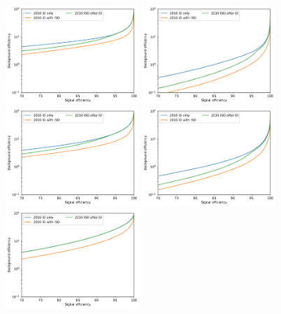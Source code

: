 \begin{figure}[!htb]
   \vspace*{0.3cm}
   \begin{center}
      \includegraphics[width=0.45\textwidth]{Figures/Electrons/2016_EB1_5_.pdf}
      \includegraphics[width=0.45\textwidth]{Figures/Electrons/2016_EB1_10_.pdf} \\
      \includegraphics[width=0.45\textwidth]{Figures/Electrons/2016_EB2_5_.pdf}
      \includegraphics[width=0.45\textwidth]{Figures/Electrons/2016_EB2_10_.pdf} \\
      \includegraphics[width=0.45\textwidth]{Figures/Electrons/2016_EE_5_.pdf}

\end{center}
\end{figure}
